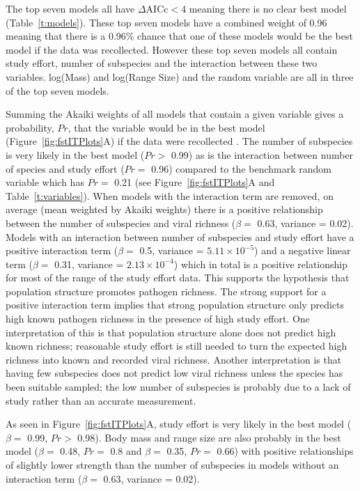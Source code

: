 
The top seven models all have $\Delta\text{AICc} < 4$ meaning there is no clear best model (Table~\ref{t:models}).
These top seven models have a combined weight of 0.96 meaning that there is a 0.96\% chance that one of these models would be the best model if the data was recollected.
However these top seven models all contain study effort, number of subspecies and the interaction between these two variables.
log(Mass) and log(Range Size) and the random variable are all in three of the top seven models.

Summing the Akaiki weights of all models that contain a given variable gives a probability, $Pr$, that the variable would be in the best model (Figure~\ref{fig:fstITPlots}A) if the data were recollected \cite{whittingham2006we}.
The number of subspecies is very likely in the best model ($Pr > $ 0.99) as is the interaction between number of species and study effort ($Pr = $ 0.96) compared to the benchmark random variable which has $Pr = $ 0.21 (see Figure~\ref{fig:fstITPlots}A and Table~\ref{t:variables}).
When models with the interaction term are removed, on average (mean weighted by Akaiki weights) there is a positive relationship between the number of subspecies and viral richness ($\beta = $ 0.63, variance = 0.02).
Models with an interaction between number of subspecies and study effort have a positive interaction term ($\beta = $ 0.5, variance = \ensuremath{5.11\times 10^{-5}}) and a negative linear term ($\beta = $ 0.31, variance = \ensuremath{2.13\times 10^{-4}}) which in total is a positive relationship for most of the range of the study effort data.
This supports the hypothesis that population structure promotes pathogen richness.
The strong support for a positive interaction term implies that strong population structure only predicts high known pathogen richness in the presence of high study effort.
One interpretation of this is that population structure alone does not predict high known richness; reasonable study effort is still needed to turn the expected high richness into known and recorded viral richness.
Another interpretation is that having few subspecies does not predict low viral richness unless the species has been suitable sampled; the low number of subspecies is probably due to a lack of study rather than an accurate measurement.

As seen in Figure~\ref{fig:fstITPlots}A, study effort is very likely in the best model ($\beta = $ 0.99, $Pr > $ 0.98).
Body mass and range size are also probably in the best model ($\beta = $ 0.48, $Pr = $ 0.8 and $\beta = $ 0.35, $Pr = $ 0.66) with positive relationships of slightly lower strength than the number of subspecies in models without an interaction term ($\beta = $ 0.63, variance = 0.02).	



